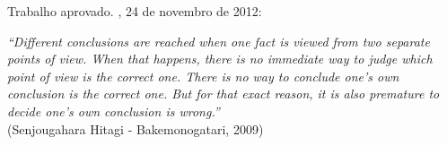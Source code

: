 \begin{folhadeaprovacao}
	\begin{center}
	  {\ABNTEXchapterfont\large\imprimirautor}
	  \vspace*{\fill}\vspace*{\fill}
	  \begin{center}
		\ABNTEXchapterfont\bfseries\Large\imprimirtitulo
	  \end{center}
	  \vspace*{\fill}
	  \hspace{.45\textwidth}
	  \begin{minipage}{.5\textwidth}
		  \imprimirpreambulo
	  \end{minipage}%
	  \vspace*{\fill}
	 \end{center}
		  
	 Trabalho aprovado. \imprimirlocal, 24 de novembro de 2012:
  
		
	 \begin{center}
	  \vspace*{0.5cm}
	  {\large\imprimirlocal}
	  \par
	  {\large\imprimirdata}
	  \vspace*{1cm}
	\end{center}
	
\end{folhadeaprovacao}
\begin{epigrafe}
	\vspace*{\fill}
	\begin{flushright}
		\textit{``Different conclusions are reached when one fact is viewed from two separate points of view. When that happens, there is no immediate way to judge which point of view is the correct one. There is no way to conclude one’s own conclusion is the correct one. But for that exact reason, it is also premature to decide one’s own conclusion is wrong.''}\\(Senjougahara Hitagi {-} Bakemonogatari, 2009)
	\end{flushright}
\end{epigrafe}